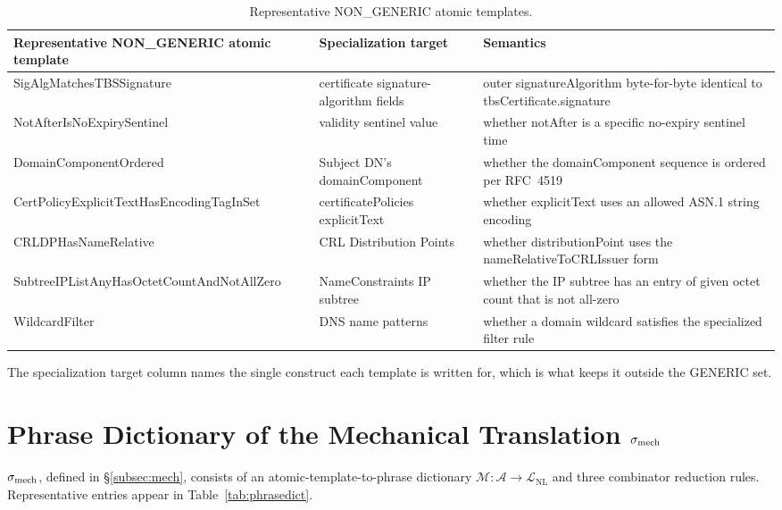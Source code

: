 \begin{table}[tb]
\centering
\footnotesize
\caption{Representative NON\_GENERIC atomic templates.}
\label{tab:nongeneric}
\begin{tabularx}{\textwidth}{@{}p{4.6cm} p{3cm} X@{}}
\toprule
Representative NON\_GENERIC atomic template & Specialization target &
  Semantics \\
\midrule
SigAlgMatchesTBSSignature & certificate signature-algorithm fields &
  outer signatureAlgorithm byte-for-byte identical to
  tbsCertificate.signature \\
NotAfterIsNoExpirySentinel & validity sentinel value & whether
  notAfter is a specific no-expiry sentinel time \\
DomainComponentOrdered & Subject DN's domainComponent &
  whether the domainComponent sequence is ordered per RFC~4519 \\
CertPolicy\-ExplicitText\-HasEncodingTagInSet & certificatePolicies
  explicitText & whether explicitText uses an allowed ASN.1 string encoding \\
CRLDPHasNameRelative & CRL Distribution Points & whether
  distributionPoint uses the nameRelativeToCRLIssuer form \\
SubtreeIPListAny\-HasOctetCount\-AndNotAllZero & NameConstraints IP subtree
  & whether the IP subtree has an entry of given octet count that is not
  all-zero \\
WildcardFilter & DNS name patterns & whether a domain wildcard
  satisfies the specialized filter rule \\
\bottomrule
\end{tabularx}
\end{table}

The specialization target column names the single construct each template is
written for, which is what keeps it outside the GENERIC set.

\section{Phrase Dictionary of the Mechanical Translation $\sigma_{\mathrm{mech}}$}
\label{app:sigma}

$\sigma_{\mathrm{mech}}$, defined in \S\ref{subsec:mech}, consists of an
atomic-template-to-phrase dictionary $\mathcal{M} : \mathcal{A} \to
\mathcal{L}_{\mathrm{NL}}$ and three combinator reduction rules. Representative
entries appear in Table~\ref{tab:phrasedict}.

